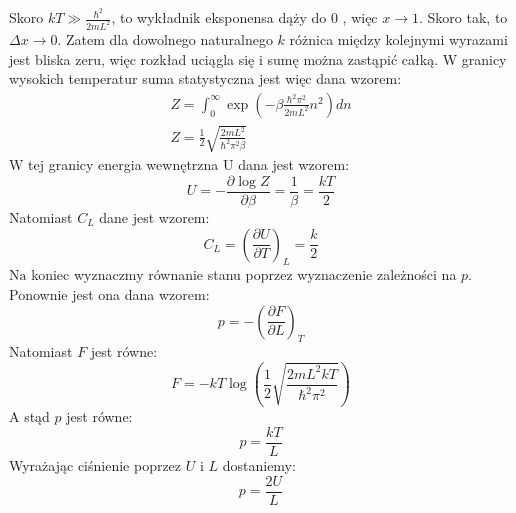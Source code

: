 \documentclass[12pt,a4paper]{article}
\begin{document}
Skoro $k T \gg \frac{\hbar^{2}}{2 m L^{2}}$, to wykładnik eksponensa dąży do 0 , więc $x \rightarrow 1$. Skoro tak, to $\Delta x \rightarrow 0$. Zatem dla dowolnego naturalnego $k$ różnica między kolejnymi wyrazami jest bliska zeru, więc rozkład uciągla się i sumę można zastąpić całką. W granicy wysokich temperatur suma statystyczna jest więc dana wzorem:
$$
\begin{gathered}
Z=\int_{0}^{\infty} \exp \left(-\beta \frac{\hbar^{2} \pi^{2}}{2 m L^{2}} n^{2}\right) d n \\
Z=\frac{1}{2} \sqrt{\frac{2 m L^{2}}{\hbar^{2} \pi^{2} \beta}}
\end{gathered}
$$
W tej granicy energia wewnętrzna U dana jest wzorem:
$$
U=-\frac{\partial \log Z}{\partial \beta}=\frac{1}{\beta}=\frac{k T}{2}
$$
Natomiast $C_{L}$ dane jest wzorem:
$$
C_{L}=\left(\frac{\partial U}{\partial T}\right)_{L}=\frac{k}{2}
$$
$\mathrm{Na}$ koniec wyznaczmy równanie stanu poprzez wyznaczenie zależności na $p$. Ponownie jest ona dana wzorem:
$$
p=-\left(\frac{\partial F}{\partial L}\right)_{T}
$$
Natomiast $F$ jest równe:
$$
F=-k T \log \left(\frac{1}{2} \sqrt{\frac{2 m L^{2} k T}{\hbar^{2} \pi^{2}}}\right)
$$
A stąd $p$ jest równe:
$$
p=\frac{k T}{L}
$$
Wyrażając ciśnienie poprzez $U$ i $L$ dostaniemy:
$$
p=\frac{2 U}{L}
$$
\end{document}
